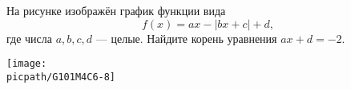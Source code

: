 \begin{class}[number=3]
\begin{listofex}
		\item
		\begin{minipage}[t]{\bodywidth}
			На рисунке изображён график функции вида \[ f(x)=ax-|bx+c|+d, \] где числа \(a, b, c, d\) --- целые. Найдите корень уравнения \(ax+d=-2\).
		\end{minipage}
		\hspace{0.02\linewidth}
		\begin{minipage}[t]{\picwidth}
			\texttt{[image: \\picpath/G101M4C6-8]}
		\end{minipage}
	\end{listofex}
\end{class}

